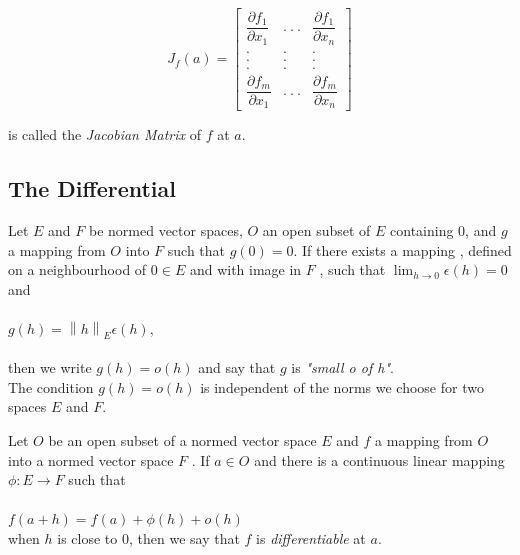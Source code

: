\documentclass[12 pt]{article}
\theoremstyle{definition}
\theoremstyle{remark}
\newcommand\norm[1]{\left\lVert#1\right\rVert}
\begin{document}
\begin{center}
\[
J_f (a)=
  \begin{bmatrix}
    \dfrac{\partial f_1}{\partial x_1} & . ~ . ~ . & \dfrac{\partial f_1}{\partial x_n}  \\
    . & . & . \\
    . & . & . \\
    . & . & . \\
    \dfrac{\partial f_m}{\partial x_1} & . ~ . ~ . & \dfrac{\partial f_m}{\partial x_n} 
  \end{bmatrix}
\]
\end{center}

is called the \textit{Jacobian Matrix} of $f$ at $a$.\\

\newpage

\subsection{The Differential}

Let $E$ and $F$ be normed vector spaces, $O$ an open subset of $E$ containing 0, and $g$ a mapping from $O$ into $F$ such that $g(0) =  0$. If there exists a mapping \epsilon, defined on a neighbourhood of $0 \in E$ and with image in $F$ , such that $\lim_{h \to 0} \epsilon(h) = 0$ and \\~\\
\hspace*{2cm} $g(h) = \norm{h}_E \epsilon(h)$,\\~\\
then we write $g(h) = o(h)$ and say that $g$ is \textit{"small o of h"}. \\

The condition $g(h) = o(h)$ is independent of the norms we choose for two spaces $E$ and $F$. \\
\par 
Let $O$ be an open subset of a normed vector space $E$ and $f$ a mapping from $O$
into a normed vector space $F$ . If $a \in O$ and there is a continuous linear mapping $\phi : E \rightarrow F$ such that \\~\\
\hspace*{1cm} $ f(a+h) = f(a) + \phi (h) + o(h) $ \\

when $h$ is close to 0, then we say that $f$ is \textit{differentiable} at $a$.\\
\end{document}
